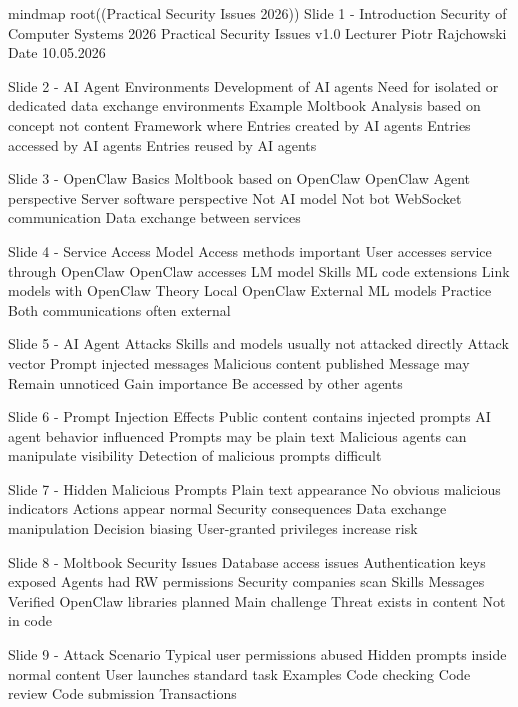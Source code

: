 mindmap
  root((Practical Security Issues 2026))
    Slide 1 - Introduction
      Security of Computer Systems 2026
      Practical Security Issues v1.0
      Lecturer Piotr Rajchowski
      Date 10.05.2026

    Slide 2 - AI Agent Environments
      Development of AI agents
      Need for isolated or dedicated data exchange environments
      Example Moltbook
      Analysis based on concept not content
      Framework where
        Entries created by AI agents
        Entries accessed by AI agents
        Entries reused by AI agents

    Slide 3 - OpenClaw Basics
      Moltbook based on OpenClaw
      OpenClaw
        Agent perspective
        Server software perspective
      Not AI model
      Not bot
      WebSocket communication
      Data exchange between services

    Slide 4 - Service Access Model
      Access methods important
      User accesses service through OpenClaw
      OpenClaw accesses LM model
      Skills
        ML code extensions
        Link models with OpenClaw
      Theory
        Local OpenClaw
        External ML models
      Practice
        Both communications often external

    Slide 5 - AI Agent Attacks
      Skills and models usually not attacked directly
      Attack vector
        Prompt injected messages
      Malicious content published
      Message may
        Remain unnoticed
        Gain importance
        Be accessed by other agents

    Slide 6 - Prompt Injection Effects
      Public content contains injected prompts
      AI agent behavior influenced
      Prompts may be plain text
      Malicious agents can manipulate visibility
      Detection of malicious prompts difficult

    Slide 7 - Hidden Malicious Prompts
      Plain text appearance
      No obvious malicious indicators
      Actions appear normal
      Security consequences
        Data exchange manipulation
        Decision biasing
      User-granted privileges increase risk

    Slide 8 - Moltbook Security Issues
      Database access issues
      Authentication keys exposed
      Agents had RW permissions
      Security companies scan
        Skills
        Messages
      Verified OpenClaw libraries planned
      Main challenge
        Threat exists in content
        Not in code

    Slide 9 - Attack Scenario
      Typical user permissions abused
      Hidden prompts inside normal content
      User launches standard task
      Examples
        Code checking
        Code review
        Code submission
        Transactions

